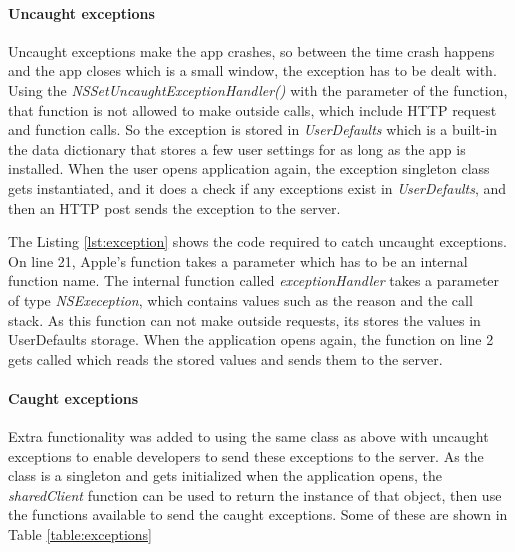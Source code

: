 \paragraph{Uncaught exceptions}

Uncaught exceptions make the app crashes, so between the time crash happens and the app closes which is a small window, the exception has to be dealt with. Using the \textit{NSSetUncaughtExceptionHandler()} with the parameter of the function, that function is not allowed to make outside calls, which include HTTP request and function calls. So the exception is stored in \textit{UserDefaults} which is a built-in the data dictionary that stores a few user settings for as long as the app is installed. When the user opens application again, the exception singleton class gets instantiated, and it does a check if any exceptions exist in \textit{UserDefaults}, and then an HTTP post sends the exception to the server. 

The Listing \ref{lst:exception} shows the code required to catch uncaught exceptions. On line 21, Apple’s function takes a parameter which has to be an internal function name. The internal function called \textit{exceptionHandler} takes a parameter of type \textit{NSExeception}, which contains values such as the reason and the call stack. As this function can not make outside requests, its stores the values in UserDefaults storage. When the application opens again, the function on line 2 gets called which reads the stored values and sends them to the server.



\paragraph{Caught exceptions}

Extra functionality was added to using the same class as above with uncaught exceptions to enable developers to send these exceptions to the server. As the class is a singleton and gets initialized when the application opens, the \textit{sharedClient} function can be used to return the instance of that object, then use the functions available to send the caught exceptions. Some of these are shown in Table \ref{table:exceptions}

